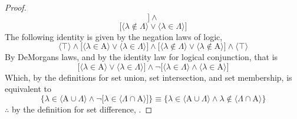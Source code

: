 \documentclass[preview]{standalone}
\begin{document}
\begin{proof}
\begin{equation*}
        \bigg]
            \land
    \end{equation*}
    \begin{equation*}
        \bigg[
            \Big \langle \lambda \notin \Lambda \Big \rangle
                \lor 
            \Big \langle \lambda \in \Lambda \Big \rangle
        \bigg]
    \end{equation*}
    The following identity is given by the negation laws of logic,
    \begin{equation*}
        \big \langle \top \big \rangle
            \land
        \bigg[
            \Big \langle \lambda \in \mathrm{A} \Big \rangle
                \lor 
            \Big \langle \lambda \in \Lambda \Big \rangle
        \bigg]
            \land
        \bigg[
            \Big \langle \lambda \notin \Lambda \Big \rangle
                \lor
            \Big \langle \lambda \notin \mathrm{A} \Big \rangle
        \bigg]
            \land
        \big \langle \top \big \rangle
    \end{equation*}
    By DeMorgans laws,
    and by the identity law for logical conjunction, 
    that is
    \begin{equation*}
        \bigg[
            \Big \langle \lambda \in \mathrm{A} \Big \rangle
                \lor 
            \Big \langle \lambda \in \Lambda \Big \rangle
        \bigg]
            \land
        \lnot \bigg[
            \Big \langle \lambda \in \Lambda \Big \rangle
                \land
            \Big \langle \lambda \in \mathrm{A} \Big \rangle
        \bigg]
    \end{equation*}
    Which, by the definitions for set union, set intersection,
    and set membership, is equivalent to
    \begin{equation*}
        \Bigg\{
            \lambda \in \Big \langle \mathrm{A} \cup \Lambda \Big \rangle
                \land
            \lnot \bigg[ 
                \lambda \in \Big \langle \Lambda \cap \mathrm{A} \Big \rangle
            \bigg]
        \Bigg\}
            \equiv
        \Bigg\{
            \lambda \in \Big \langle \mathrm{A} \cup \Lambda \Big \rangle
                \land
            \lambda \notin \Big \langle \Lambda \cap \mathrm{A} \Big \rangle
        \Bigg\}
    \end{equation*}
    $\therefore$ by the definition for set difference,
    .
\end{proof}
\end{document}
